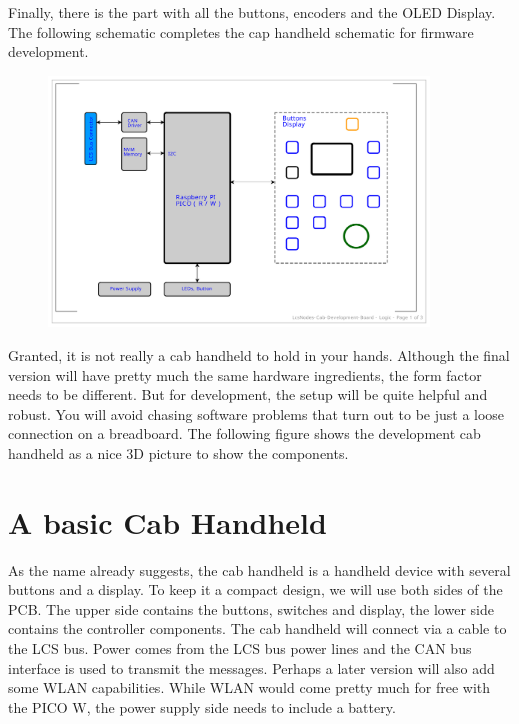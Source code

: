Finally, there is the part with all the buttons, encoders and the OLED Display. The following schematic completes the cap handheld schematic for firmware development.

\begin{figure}[htbp]
    \centering
    \includegraphics[page=3, width=0.9\textwidth]{./Schematics/Schematic_LcsNodes-Cab-Dev.pdf}
\end{figure}
\FloatBarrier

Granted, it is not really a cab handheld to hold in your hands. Although the final version will have pretty much the same hardware ingredients, the form factor needs to be different. But for development, the setup will be quite helpful and robust. You will avoid chasing software problems that turn out to be just a loose connection on a breadboard. The following figure shows the development cab handheld as a nice 3D picture to show the components.

\section{A basic Cab Handheld}

As the name already suggests, the cab handheld is a handheld device with several buttons and a display. To keep it a compact design, we will use both sides of the PCB. The upper side contains the buttons, switches and display, the lower side contains the controller components. The cab handheld will connect via a cable to the LCS bus. Power comes from the LCS bus power lines and the CAN bus interface is used to transmit the messages. Perhaps a later version will also add some WLAN capabilities. While WLAN would come pretty much for free with the PICO W, the power supply side needs to include a battery.

